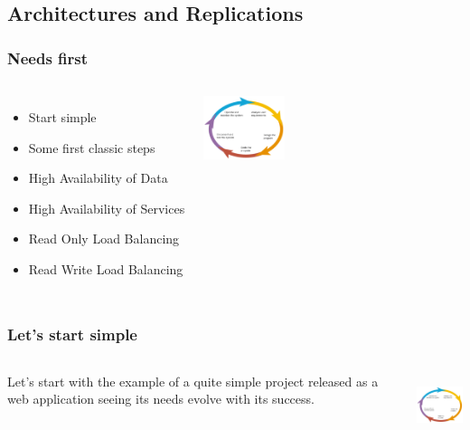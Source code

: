 \documentclass[english]{beamer}
\begin{document}
\subsection{Architectures and Replications}

\begin{frame}[fragile]
  \frametitle{Needs first}

  \vfill

\begin{columns}[c]

\begin{itemize}
  \item Start simple
  \item Some first classic steps
  \item High Availability of Data
  \item High Availability of Services
  \item Read Only Load Balancing
  \item Read Write Load Balancing
\end{itemize}

\includegraphics[height=5em]{development_life_cycle.png}
\end{columns}
\end{frame}

\begin{frame}[fragile]
  \frametitle{Let's start simple}

  \vfill

\begin{columns}[c]

  Let's start with the example of a quite simple project released as a web
  application seeing its needs evolve with its success.


\includegraphics[height=5em]{development_life_cycle.png}
\end{columns}
\end{frame}
\end{document}
